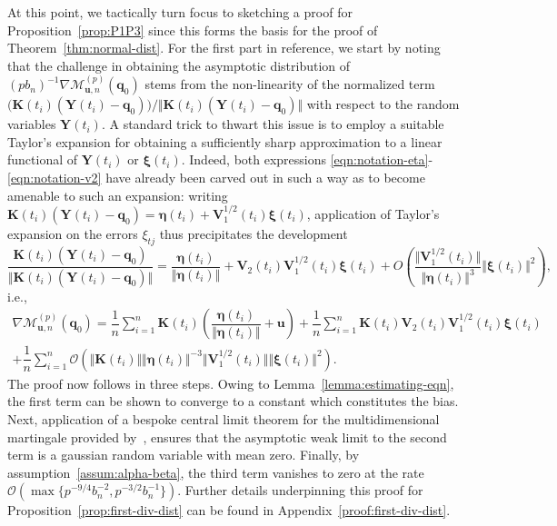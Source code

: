 \documentclass[aos]{imsart}
\theoremstyle{plain}
\theoremstyle{remark}
\newcommand{\Mcal}{\mathcal{M}}
\newcommand{\bb}[1]{\boldsymbol{#1}}
\newcommand{\cnam}[1]{\textcolor{mypurple}{#1}}
\begin{document}
At this point, we tactically turn focus to sketching a proof for Proposition~\ref{prop:P1P3} since this forms the basis for the proof of Theorem~\ref{thm:normal-dist}. For the first part in reference, we start by noting that the challenge in obtaining the asymptotic distribution of $(pb_n)^{-1} \nabla\Mcal_{\bb{u},n}^{(p)}(\bb{q}_0)$ stems from \cnam{the non-linearity of the normalized term
%
$
   \bigl(  \bb{K}(t_i)(\bb{Y}(t_i) - \bb{q}_0)\bigr) / \Vert \bb{K}(t_i)(\bb{Y}(t_i) - \bb{q}_0) \Vert
$
%
with respect to \cnam{the random variables $\bb{Y}(t_i)$. A standard trick to thwart this issue is to employ a suitable Taylor's expansion for obtaining} a sufficiently sharp approximation to a linear functional of  $\bb{Y}(t_i)$ or $\bb{\xi}(t_i)$. Indeed, both expressions \eqref{eqn:notation-eta}-\eqref{eqn:notation-v2} have already been carved out in such a way as to become amenable to such an expansion: writing $\bb{K}(t_i)(\bb{Y}(t_i) - \bb{q}_0) = \bb{\eta}(t_i) + \bb{V}_1^{1/2}(t_i)\bb{\xi}(t_i)$, application of Taylor's expansion on the errors $\xi_{tj}$ thus precipitates the development}
\begin{equation*}
    \dfrac{\bb{K}(t_i)(\bb{Y}(t_i) - \bb{q}_0)}{\Vert \bb{K}(t_i)(\bb{Y}(t_i) - \bb{q}_0) \Vert} = \dfrac{\bb{\eta}(t_i)}{\Vert \bb{\eta}(t_i) \Vert} + \bb{V}_2(t_i)\bb{V}_1^{1/2}(t_i) \bb{\xi}(t_i) + O\left(\dfrac{\Vert \bb{V}_1^{1/2}(t_i)\Vert}{\Vert \bb{\eta}(t_i)\Vert^3} \Vert \bb{\xi}(t_i) \Vert^2\right),
\end{equation*}
i.e.,
\begin{multline*}
    \nabla \Mcal_{\bb{u},n}^{(p)}(\bb{q}_0)
    = \dfrac{1}{n} \sum_{i=1}^n \bb{K}(t_i) \left( \dfrac{\bb{\eta}(t_i)}{\Vert \bb{\eta}(t_i) \Vert} + \bb{u} \right) + \dfrac{1}{n} \sum_{i=1}^n \bb{K}(t_i) \bb{V}_2(t_i)\bb{V}_1^{1/2}(t_i) \bb{\xi}(t_i)\\
    + \dfrac{1}{n}\sum_{i=1}^n \mathcal{O}(\Vert \bb{K}(t_i) \Vert \Vert \bb{\eta}(t_i)\Vert^{-3} \Vert \bb{V}_1^{1/2}(t_i) \Vert \Vert \bb{\xi}(t_i) \Vert^2).
\end{multline*}
The proof now follows in three steps. Owing to Lemma~\ref{lemma:estimating-eqn}, the first term can be shown to converge to a constant which constitutes the bias. Next, application of a bespoke central limit theorem for the multidimensional martingale provided by~\citet{belloni2018high}, ensures that the asymptotic weak limit to the second term is a gaussian random variable with mean zero. Finally, \cnam{by assumption~\ref{assum:alpha-beta}, the third term vanishes to zero at the rate $\mathcal{O}(\max\{ p^{-9/4}b_n^{-2}, p^{-3/2}b_n^{-1} \})$.  Further details underpinning this proof for Proposition~\ref{prop:first-div-dist} can be found in Appendix~\ref{proof:first-div-dist}.}
\end{document}
